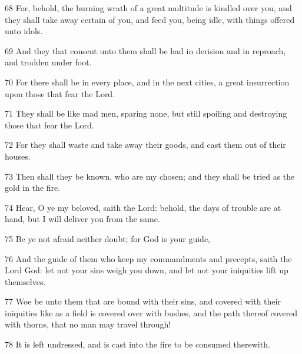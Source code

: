 \par 68 For, behold, the burning wrath of a great multitude is kindled over you, and they shall take away certain of you, and feed you, being idle, with things offered unto idols.
\par 69 And they that consent unto them shall be had in derision and in reproach, and trodden under foot.
\par 70 For there shall be in every place, and in the next cities, a great insurrection upon those that fear the Lord.
\par 71 They shall be like mad men, sparing none, but still spoiling and destroying those that fear the Lord.
\par 72 For they shall waste and take away their goods, and cast them out of their houses.
\par 73 Then shall they be known, who are my chosen; and they shall be tried as the gold in the fire.
\par 74 Hear, O ye my beloved, saith the Lord: behold, the days of trouble are at hand, but I will deliver you from the same.
\par 75 Be ye not afraid neither doubt; for God is your guide,
\par 76 And the guide of them who keep my commandments and precepts, saith the Lord God: let not your sins weigh you down, and let not your iniquities lift up themselves.
\par 77 Woe be unto them that are bound with their sins, and covered with their iniquities like as a field is covered over with bushes, and the path thereof covered with thorns, that no man may travel through!
\par 78 It is left undressed, and is cast into the fire to be consumed therewith.

